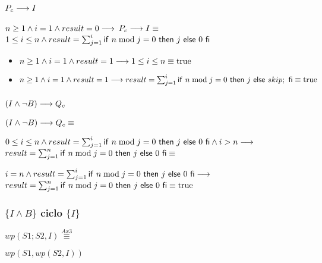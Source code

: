 \documentclass{article}
\begin{document}
\subsubsection*{$P_{c} \longrightarrow I$}

$n \geq 1 \wedge i = 1 \wedge result = 0 \longrightarrow$
$P_{c} \longrightarrow I \equiv$
$1 \leq i \leq n \wedge result = \sum_{j=1}^{i} \mathsf{if}\ n \bmod j = 0\ \mathsf{then}\ j\ \mathsf{else}\ 0\ \mathsf{fi}$

\begin{itemize}
    \item $n \geq 1 \wedge i = 1 \wedge result = 1 \longrightarrow 1 \leq i \leq n \equiv \mathrm{true}$
    \item $n \geq 1 \wedge i = 1 \wedge result = 1 \longrightarrow result = \sum_{j=1}^{i} \mathsf{if}\ n \bmod j = 0\ \mathsf{then}\ j\ \mathsf{else}\ skip;\ \mathsf{fi} \equiv \mathrm{true}$
\end{itemize}

\subsubsection*{$(I \wedge \neg B) \longrightarrow Q_{c}$}

$(I \wedge \neg B) \longrightarrow Q_{c} \equiv$

$0 \leq i \leq n \wedge result = \sum_{j=1}^{i} \mathsf{if}\ n \bmod j = 0\ \mathsf{then}\ j\ \mathsf{else}\ 0\ \mathsf{fi} \wedge i > n \longrightarrow$
$result = \sum_{j=1}^{n} \mathsf{if}\ n \bmod j = 0\ \mathsf{then}\ j\ \mathsf{else}\ 0\ \mathsf{fi} \equiv$

$i = n \wedge result = \sum_{j=1}^{i} \mathsf{if}\ n \bmod j = 0\ \mathsf{then}\ j\ \mathsf{else}\ 0\ \mathsf{fi} \longrightarrow$
$result = \sum_{j=1}^{n} \mathsf{if}\ n \bmod j = 0\ \mathsf{then}\ j\ \mathsf{else}\ 0\ \mathsf{fi} \equiv \mathrm{true}$

\subsubsection*{$\{I \wedge B\}$ ciclo $\{ I \}$}

$wp(S1;S2, I) \stackrel{Ax3}{\equiv}$

$wp(S1, wp(S2, I))$
\end{document}
